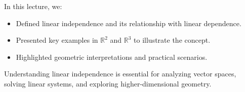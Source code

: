 \documentclass{article}
\begin{document}
In this lecture, we:
\begin{itemize}
  \item Defined linear independence and its relationship with linear dependence.
  \item Presented key examples in $\mathbb{R}^2$ and $\mathbb{R}^3$ to illustrate the concept.
  \item Highlighted geometric interpretations and practical scenarios.
\end{itemize}

Understanding linear independence is essential for analyzing vector spaces, solving linear systems, and exploring higher-dimensional geometry.
\end{document}
